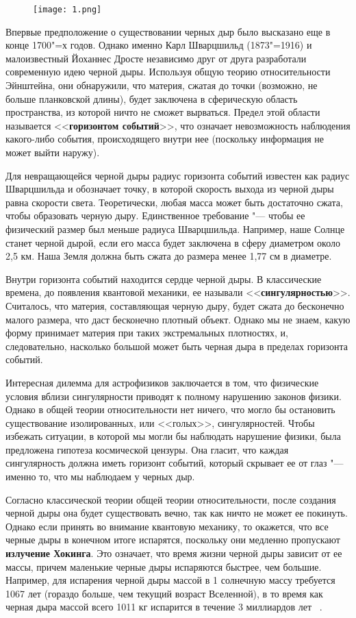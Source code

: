 \documentclass[bachelor, och, referat]{SCWorks}
\begin{document}
\begin{figure}[h!]
    \centering
    \texttt{[image: 1.png]}
\end{figure}

Впервые предположение о существовании черных дыр было высказано еще в конце 1700"=х годов. Однако именно Карл Шварцшильд (1873"=1916) и малоизвестный Йоханнес Дросте независимо друг от друга разработали современную идею черной дыры. Используя общую теорию относительности Эйнштейна, они обнаружили, что материя, сжатая до точки (возможно, не больше планковской длины), будет заключена в сферическую область пространства, из которой ничто не сможет вырваться. Предел этой области называется <<\textbf{горизонтом событий}>>, что означает невозможность наблюдения какого-либо события, происходящего внутри нее (поскольку информация не может выйти наружу).

Для невращающейся черной дыры радиус горизонта событий известен как радиус Шварцшильда и обозначает точку, в которой скорость выхода из черной дыры равна скорости света. Теоретически, любая масса может быть достаточно сжата, чтобы образовать черную дыру. Единственное требование "--- чтобы ее физический размер был меньше радиуса Шварцшильда. Например, наше Солнце станет черной дырой, если его масса будет заключена в сферу диаметром около 2,5 км. Наша Земля должна быть сжата до размера менее 1,77 см в диаметре.

Внутри горизонта событий находится сердце черной дыры. В классические времена, до появления квантовой механики, ее называли <<\textbf{сингулярностью}>>. Считалось, что материя, составляющая черную дыру, будет сжата до бесконечно малого размера, что даст бесконечно плотный объект. Однако мы не знаем, какую форму принимает материя при таких экстремальных плотностях, и, следовательно, насколько большой может быть черная дыра в пределах горизонта событий.

Интересная дилемма для астрофизиков заключается в том, что физические условия вблизи сингулярности приводят к полному нарушению законов физики. Однако в общей теории относительности нет ничего, что могло бы остановить существование изолированных, или <<голых>>, сингулярностей. Чтобы избежать ситуации, в которой мы могли бы наблюдать нарушение физики, была предложена гипотеза космической цензуры. Она гласит, что каждая сингулярность должна иметь горизонт событий, который скрывает ее от глаз "--- именно то, что мы наблюдаем у черных дыр.

Согласно классической теории общей теории относительности, после создания черной дыры она будет существовать вечно, так как ничто не может ее покинуть. Однако если принять во внимание квантовую механику, то окажется, что все черные дыры в конечном итоге испарятся, поскольку они медленно пропускают \textbf{излучение Хокинга}. Это означает, что время жизни черной дыры зависит от ее массы, причем маленькие черные дыры испаряются быстрее, чем большие. Например, для испарения черной дыры массой в 1 солнечную массу требуется 1067 лет (гораздо больше, чем текущий возраст Вселенной), в то время как черная дыра массой всего 1011 кг испарится в течение 3 миллиардов лет ~\cite{1}.
\end{document}
